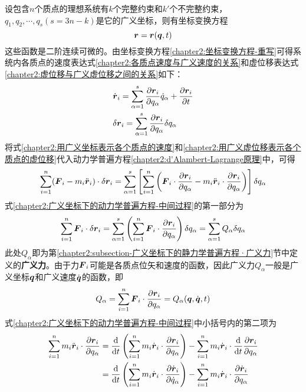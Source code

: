 设包含$n$个质点的理想系统有$k$个完整约束和$k'$个不完整约束，$q_1,q_2,\cdots,q_s(s=3n-k)$是它的广义坐标，则有坐标变换方程
\begin{equation}
	\boldsymbol{r}=\boldsymbol{r}(\boldsymbol{q},t)
	\label{chapter2:坐标变换方程-重写}
\end{equation}
这些函数是二阶连续可微的。由坐标变换方程\eqref{chapter2:坐标变换方程-重写}可得系统内各质点的速度表达式\eqref{chapter2:各质点速度与广义速度的关系}和虚位移表达式\eqref{chapter2:虚位移与广义虚位移之间的关系}如下：
\begin{align}
	& \dot{\boldsymbol{r}}_i = \sum_{\alpha=1}^s \frac{\partial \boldsymbol{r}_i}{\partial q_\alpha}\dot{q}_\alpha+ \frac{\partial \boldsymbol{r}_i}{\partial t} \label{chapter2:用广义坐标表示各个质点的速度} \\
	& \delta \boldsymbol{r}_i = \sum_{\alpha=1}^s \frac{\partial \boldsymbol{r}_i}{\partial q_\alpha} \delta q_\alpha \label{chapter2:用广义虚位移表示各个质点的虚位移}
\end{align}
将式\eqref{chapter2:用广义坐标表示各个质点的速度}和\eqref{chapter2:用广义虚位移表示各个质点的虚位移}代入动力学普遍方程\eqref{chapter2:d'Alambert-Lagrange原理}中，可得
\begin{equation}
	\sum_{i=1}^n (\boldsymbol{F}_i-m_i\ddot{\boldsymbol{r}}_i)\cdot \delta \boldsymbol{r}_i = \sum_{\alpha=1}^s \left[\sum_{i=1}^n\left(\boldsymbol{F}_i\cdot \frac{\partial\boldsymbol{r}_i}{\partial q_\alpha} - m_i\ddot{\boldsymbol{r}}_i\cdot \frac{\partial\boldsymbol{r}_i}{\partial q_\alpha} \right)\right] \delta q_\alpha
	\label{chapter2:广义坐标下的动力学普遍方程-中间过程}
\end{equation}
式\eqref{chapter2:广义坐标下的动力学普遍方程-中间过程}的第一部分为
\begin{equation}
	\sum_{i=1}^n \boldsymbol{F}_i\cdot \delta \boldsymbol{r}_i = \sum_{\alpha=1}^s \left(\sum_{i=1}^n \boldsymbol{F}_i \cdot \frac{\partial \boldsymbol{r}_i}{\partial q_\alpha}\right) \delta q_\alpha = \sum_{\alpha=1}^s Q_\alpha \delta q_\alpha
	\label{chapter2:广义坐标下的动力学普遍方程-中间过程-第一部分}
\end{equation}
此处$Q_\alpha$即为第\ref{chapter2:subsection-广义坐标下的静力学普遍方程·广义力}节中定义的{\bf 广义力}。由于力$\boldsymbol{F}_i$可能是各质点位矢和速度的函数，因此广义力$Q_\alpha$一般是广义坐标$\boldsymbol{q}$和广义速度$\dot{\boldsymbol{q}}$的函数，即
\begin{equation}
	Q_\alpha = \sum_{i=1}^n \boldsymbol{F}_i \cdot \frac{\partial \boldsymbol{r}_i}{\partial q_\alpha} = Q_\alpha(\boldsymbol{q},\dot{\boldsymbol{q}},t)
\end{equation}
式\eqref{chapter2:广义坐标下的动力学普遍方程-中间过程}中小括号内的第二项为
\begin{align}
	\sum_{i=1}^nm_i\ddot{\boldsymbol{r}}_i\cdot \frac{\partial \boldsymbol{r}_i}{\partial q_\alpha} & = \frac{\mathrm{d}}{\mathrm{d} t} \left(\sum_{i=1}^nm_i\dot{\boldsymbol{r}}_i\cdot \frac{\partial \boldsymbol{r}_i}{\partial q_\alpha}\right) - \sum_{i=1}^nm_i\dot{\boldsymbol{r}}_i\cdot \frac{\mathrm{d}}{\mathrm{d} t}\frac{\partial \boldsymbol{r}_i}{\partial q_\alpha} \nonumber \\
	& = \frac{\mathrm{d}}{\mathrm{d} t} \left(\sum_{i=1}^nm_i\dot{\boldsymbol{r}}_i\cdot \frac{\partial \dot{\boldsymbol{r}}_i}{\partial \dot{q}_\alpha}\right) - \sum_{i=1}^nm_i\dot{\boldsymbol{r}}_i\cdot \frac{\partial \dot{\boldsymbol{r}}_i}{\partial q_\alpha}
	\label{chapter2:广义坐标下的动力学普遍方程-中间过程-第二项-初步}
\end{align}
